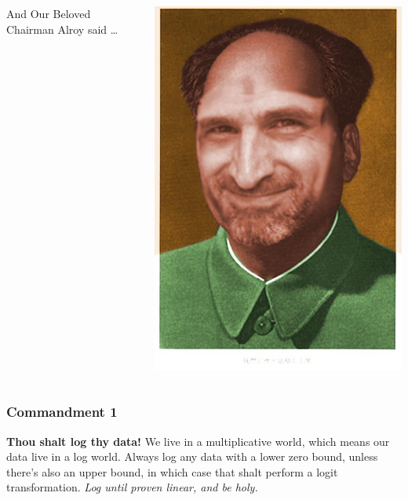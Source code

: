 \documentclass{beamer}\usepackage{graphicx, color}
\begin{document}
\begin{frame}
\frametitle{}
\begin{columns}
\begin{column}{0.5\textwidth}
\huge{And Our Beloved Chairman Alroy said \ldots}
\end{column}
\begin{column}{0.5\textwidth}
\includegraphics[width = \textwidth, keepaspectration = true]{alroy_mao}
\end{column}
\end{columns}
\end{frame}


\begin{frame}
\frametitle{Commandment 1}
\textbf{Thou shalt log thy data! }
We live in a multiplicative world, which means our data live in a log world. 
Always log any data with a lower zero bound, unless there's also an upper bound, 
in which case that shalt perform a logit transformation. 
\emph{Log until proven linear, and be holy.}
\end{frame}
\end{document}
